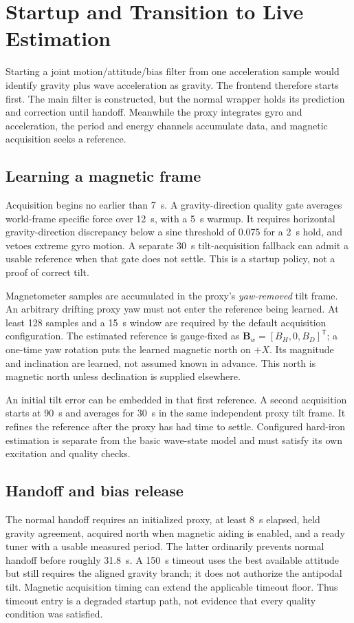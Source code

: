 \documentclass[conference]{IEEEtran}
\newcommand{\vc}[1]{\bm{#1}}
\newcommand{\tr}{^{\mathsf T}}
\begin{document}
\section{Startup and Transition to Live Estimation}
\label{sec:startup}
Starting a joint motion/attitude/bias filter from one acceleration sample
would identify gravity plus wave acceleration as gravity. The frontend
therefore starts first. The main filter is constructed, but the normal
wrapper holds its prediction and correction until handoff. Meanwhile the
proxy integrates gyro and acceleration, the period and energy channels
accumulate data, and magnetic acquisition seeks a reference.

\subsection{Learning a magnetic frame}
Acquisition begins no earlier than 7~s. A gravity-direction quality gate
averages world-frame specific force over 12~s, with a 5~s warmup. It
requires horizontal gravity-direction discrepancy below a sine threshold
of 0.075 for a 2~s hold, and vetoes extreme gyro motion. A separate 30~s
tilt-acquisition fallback can admit a usable reference when that gate
does not settle. This is a startup policy, not a proof of correct tilt.

Magnetometer samples are accumulated in the proxy's \emph{yaw-removed}
tilt frame. An arbitrary drifting proxy yaw must not enter the reference
being learned. At least 128 samples and a 15~s window are required by the
default acquisition configuration. The estimated reference is gauge-fixed
as $\vc B_w=[B_H,0,B_D]\tr$; a one-time yaw rotation puts the learned
magnetic north on $+X$. Its magnitude and inclination are learned, not
assumed known in advance. This north is magnetic north unless declination
is supplied elsewhere.

An initial tilt error can be embedded in that first reference. A second
acquisition starts at 90~s and averages for 30~s in the same independent
proxy tilt frame. It refines the reference after the proxy has had time
to settle. Configured hard-iron estimation is separate from the basic
wave-state model and must satisfy its own excitation and quality checks.

\subsection{Handoff and bias release}
The normal handoff requires an initialized proxy, at least 8~s elapsed,
held gravity agreement, acquired north when magnetic aiding is enabled,
and a ready tuner with a usable measured period. The latter ordinarily
prevents normal handoff before roughly 31.8~s. A 150~s timeout uses the
best available attitude but still requires the aligned gravity branch;
it does not authorize the antipodal tilt. Magnetic acquisition timing can
extend the applicable timeout floor. Thus timeout entry is a degraded
startup path, not evidence that every quality condition was satisfied.
\end{document}
